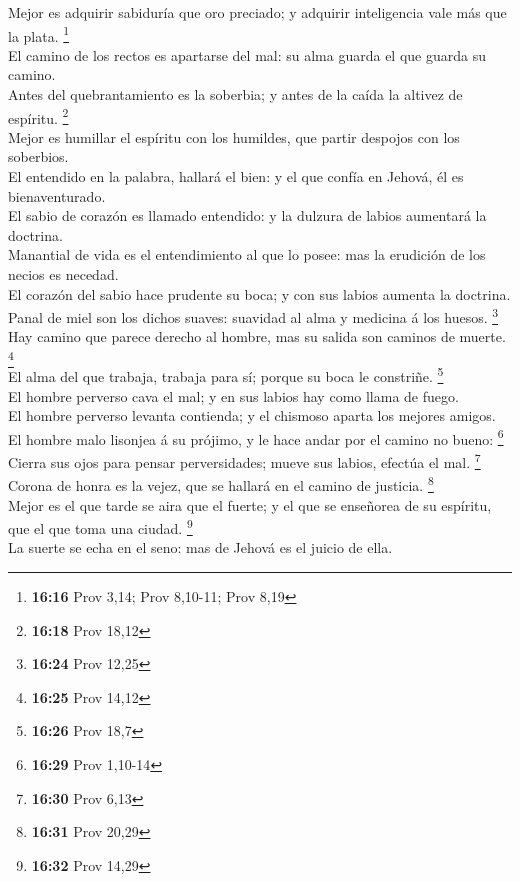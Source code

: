  Mejor es adquirir sabiduría que oro preciado; y adquirir
inteligencia vale más que la plata. \footnote{\textbf{16:16} Prov 3,14;
  Prov 8,10-11; Prov 8,19}\\
 El camino de los rectos es apartarse del mal: su alma
guarda el que guarda su camino.\\
 Antes del quebrantamiento es la soberbia; y antes de la
caída la altivez de espíritu. \footnote{\textbf{16:18} Prov 18,12}\\
 Mejor es humillar el espíritu con los humildes, que partir
despojos con los soberbios.\\
 El entendido en la palabra, hallará el bien: y el que
confía en Jehová, él es bienaventurado.\\
 El sabio de corazón es llamado entendido: y la dulzura de
labios aumentará la doctrina.\\
 Manantial de vida es el entendimiento al que lo posee: mas
la erudición de los necios es necedad.\\
 El corazón del sabio hace prudente su boca; y con sus
labios aumenta la doctrina.\\
 Panal de miel son los dichos suaves: suavidad al alma y
medicina á los huesos. \footnote{\textbf{16:24} Prov 12,25}\\
 Hay camino que parece derecho al hombre, mas su salida son
caminos de muerte. \footnote{\textbf{16:25} Prov 14,12}\\
 El alma del que trabaja, trabaja para sí; porque su boca
le constriñe. \footnote{\textbf{16:26} Prov 18,7}\\
 El hombre perverso cava el mal; y en sus labios hay como
llama de fuego.\\
 El hombre perverso levanta contienda; y el chismoso aparta
los mejores amigos.\\
 El hombre malo lisonjea á su prójimo, y le hace andar por
el camino no bueno: \footnote{\textbf{16:29} Prov 1,10-14}\\
 Cierra sus ojos para pensar perversidades; mueve sus
labios, efectúa el mal. \footnote{\textbf{16:30} Prov 6,13}\\
 Corona de honra es la vejez, que se hallará en el camino
de justicia. \footnote{\textbf{16:31} Prov 20,29}\\
 Mejor es el que tarde se aira que el fuerte; y el que se
enseñorea de su espíritu, que el que toma una ciudad. \footnote{\textbf{16:32}
  Prov 14,29}\\
 La suerte se echa en el seno: mas de Jehová es el juicio
de ella.


